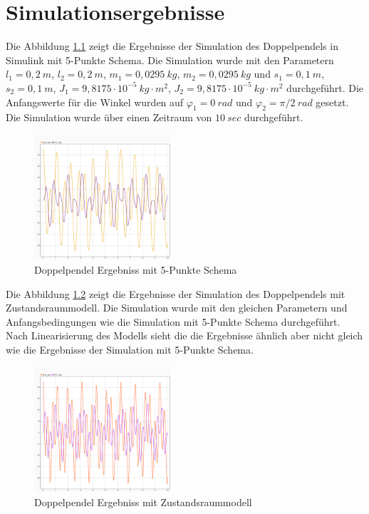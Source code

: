 \chapter{Simulationsergebnisse}\label{ch:Simulationsergebniss}

Die Abbildung \ref{fig:Doppelpendel_Ergebniss_Simulink} zeigt die Ergebnisse der Simulation des Doppelpendels in Simulink mit 5-Punkte Schema. Die Simulation wurde mit den Parametern $l_1 = 0,2~m$, $l_2 = 0,2~m$, $m_1 = 0,0295~kg$, $m_2 = 0,0295~kg$ und $s_1 = 0,1~m$, $s_2 = 0,1~m$, $J_1 = 9,8175 \cdot 10^{-5}~kg \cdot m^2$, $J_2 = 9,8175 \cdot 10^{-5}~kg \cdot m^2$ durchgeführt. Die Anfangswerte für die Winkel wurden auf $\varphi_1 = 0~rad$ und $\varphi_2 = \pi/2~rad$ gesetzt. Die Simulation wurde über einen Zeitraum von $10~sec$ durchgeführt.
\begin{figure}[H]
    \centering
    \includegraphics[width=0.45\textwidth]{figures/Doppelpendel_Ergebniss_Simulink.png}
    \caption{Doppelpendel Ergebniss mit 5-Punkte Schema}
    \label{fig:Doppelpendel_Ergebniss_Simulink}
\end{figure}

Die Abbildung \ref{fig:Doppelpendel_Ergebniss_Zustandsraum} zeigt die Ergebnisse der Simulation des Doppelpendels mit Zustandsraummodell. Die Simulation wurde mit den gleichen Parametern und Anfangsbedingungen wie die Simulation mit 5-Punkte Schema durchgeführt. Nach Linearisierung des Modells sieht die die Ergebnisse ähnlich aber nicht gleich wie die Ergebnisse der Simulation mit 5-Punkte Schema. 
\begin{figure}[H]
  \centering
  \includegraphics[width=0.45\textwidth]{figures/Doppelpendel_Ergebniss_Zustandsraum.png}
  \caption{Doppelpendel Ergebniss mit Zustandsraummodell}
  \label{fig:Doppelpendel_Ergebniss_Zustandsraum}
\end{figure}

